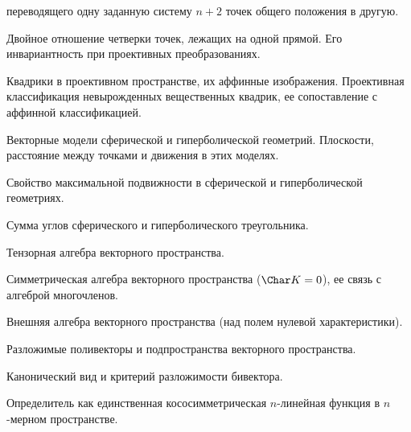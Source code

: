 \documentclass[a4paper]{article}
\begin{document}
\begin{nums}{-1}
переводящего одну заданную систему $n+2$ точек общего положения в другую.
\item Двойное отношение четверки точек, лежащих на одной прямой. Его инвариантность при проективных преобразованиях.
\item Квадрики в проективном пространстве, их аффинные изображения. Проективная классификация
невырожденных вещественных квадрик, ее сопоставление с аффинной классификацией.
\item Векторные модели сферической и гиперболической геометрий. Плоскости, расстояние между точками и движения в этих моделях.
\item Свойство максимальной подвижности в сферической и гиперболической геометриях.
\item Сумма углов сферического и гиперболического треугольника.
\item Тензорная алгебра векторного пространства.
\item Симметрическая алгебра векторного пространства ($\Char K = 0$), ее связь с алгеброй многочленов.
\item Внешняя алгебра векторного пространства (над полем нулевой характеристики).
\item Разложимые поливекторы и подпространства векторного пространства.
\item Канонический вид и критерий разложимости бивектора.
\item Определитель как единственная кососимметрическая $n$-линейная функция в $n$-мерном пространстве.
\end{nums}

\medskip\dmvntrail
\end{document}
